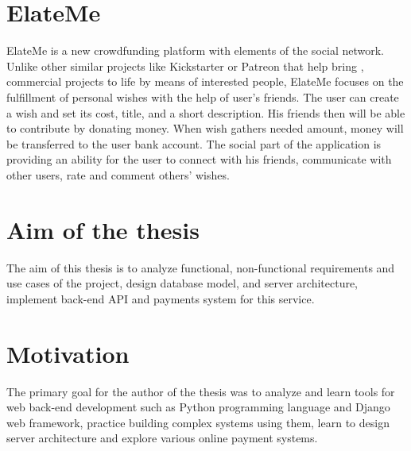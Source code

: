\section{ElateMe}
ElateMe is a new crowdfunding platform with elements of the social network. Unlike other similar projects like
Kickstarter or Patreon that help bring , commercial projects to life by means of interested people, ElateMe
focuses on the fulfillment of personal wishes with the help of user’s friends. The user can create a wish and set its
cost, title, and a short description. His friends then will be able to contribute by donating money. When wish gathers
needed amount, money will be transferred to the user bank account. The social part of the application is providing an
ability for the user to connect with his friends, communicate with other users, rate and comment others’ wishes.

\section{Aim of the thesis}
The aim of this thesis is to analyze functional, non-functional requirements and use cases of the project, design
database model, and server architecture, implement back-end \ac{API} and payments system for this service.

\section{Motivation}
The primary goal for the author of the thesis was to analyze and learn tools for web back-end development such as Python
programming language and Django web framework, practice building complex systems using them, learn to design server
architecture and explore various online payment systems.
